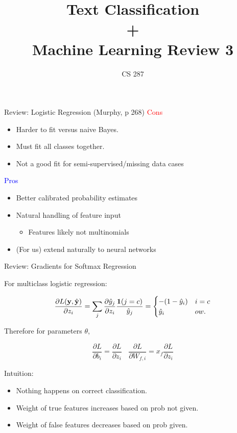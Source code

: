 \documentclass{beamer}
\title{Text Classification\\ + \\ Machine Learning Review 3 }
\date{}
\author{CS 287}
\begin{document}
\begin{frame}
  \titlepage
\end{frame}

\begin{frame}{Review:  Logistic Regression (Murphy, p 268)}
  \textcolor{red}{Cons}
  \begin{itemize}
  \item Harder to fit versus naive Bayes.
  \item Must fit all classes together.
  \item Not a good fit for semi-supervised/missing data cases

  \end{itemize}
  \textcolor{blue}{Pros}
  \begin{itemize}
  \item Better calibrated probability estimates
  \item Natural handling of feature input 
 
    \begin{itemize}
    \item Features likely not multinomials
    \end{itemize}

  \item (For us) extend naturally to neural networks 
  \end{itemize}
\end{frame}



\begin{frame}{Review: Gradients for Softmax Regression}

  For multiclass logistic regression:
  
  \[ \frac{\partial L(\mathbf{y}, \hat{\mathbf{y}})}{\partial z_i} = \sum_{j} \frac{\partial \hat{y}_j }{\partial z_i}  \frac{\mathbf{1}(j = c)} {\hat{y}_j} =     \begin{cases}
      -(1 - \hat{y}_i) & i = c\\
      \hat{y}_i & ow. \\
    \end{cases} \] 

  Therefore for parameters $\theta$, 

  \[\frac{\partial L}{\partial b_{i}} = 
    \frac{\partial L}{\partial z_{i}} \ \ \ \ \frac{\partial L}{\partial W_{f, i}} = 
     x_f \frac{\partial L}{\partial z_{i}}\]

   \pause
   Intuition:
   \begin{itemize}
   \item Nothing happens on correct classification.
   \item Weight of true features increases based on prob not given.
   \item Weight of false features decreases based on prob given.
   \end{itemize}
\end{frame}
\end{document}
